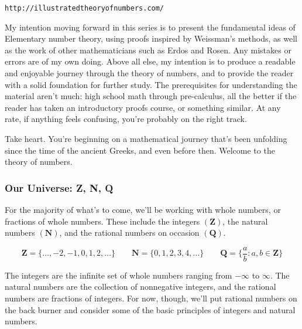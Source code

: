 \documentclass{article}
\begin{document}
\begin{verbatim} 
http://illustratedtheoryofnumbers.com/
\end{verbatim}
My intention moving forward in this series is to present the fundamental ideas of Elementary number theory, using proofs inspired by Weissman’s methods, as well as the work of other mathematicians such as Erdos and Rosen. Any mistakes or errors are of my own doing. Above all else, my intention is to produce a readable and enjoyable journey through the theory of numbers, and to provide the reader with a solid foundation for further study. The prerequisites for understanding the material aren't much: high school math through pre-calculus, all the better if the reader has taken an introductory proofs course, or something similar. At any rate, if anything feels confusing, you're probably on the right track. 

Take heart. You’re beginning on a mathematical journey that’s been unfolding since the time of the ancient Greeks, and even before then. Welcome to the theory of numbers. 

\subsubsection*{Our Universe: Z, N, Q}
For the majority of what’s to come, we’ll be working with whole numbers, or fractions of whole numbers. These include the integers $(\mathbf{Z})$, the natural numbers $(\mathbf{N})$, and the rational numbers on occasion $(\mathbf{Q})$. 
\begin{mdframed} 
\[\mathbf{Z} = \{\dots, -2, -1, 0, 1, 2, \dots\} \qquad \mathbf{N} = \{0, 1, 2, 3, 4, \dots\} \qquad \mathbf{Q} = \{\frac{a}{b} : a, b \in \mathbf{Z}\} \]
\end{mdframed} 
The integers are the infinite set of whole numbers ranging from $-\infty$ to $\infty$. The natural numbers are the collection of nonnegative integers, and the rational numbers are fractions of integers. For now, though, we'll put rational numbers on the back burner and consider some of the basic principles of integers and natural numbers. 
\end{document}
